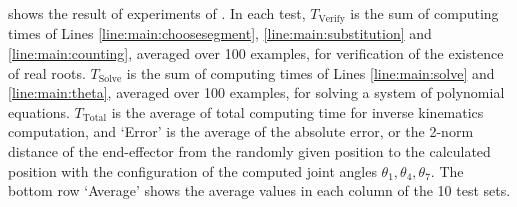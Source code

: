 \documentclass{birkjour}
\theoremstyle{plain}
\theoremstyle{definition}
\begin{document}
     shows the result of experiments of . 
    In each test, 
    $T_\textrm{Verify}$ is the sum of computing times of 
    Lines \ref{line:main:choosesegment}, \ref{line:main:substitution} and 
    \ref{line:main:counting},
    averaged over 100 examples, for verification of the existence of real roots.
    $T_\textrm{Solve}$ is the sum of computing times of 
    Lines \ref{line:main:solve} and \ref{line:main:theta},
    averaged over 100 examples, for solving a system of polynomial equations.
    $T_\textrm{Total}$ is the average of total computing time for inverse 
    kinematics computation,
    and `Error' is the average of the 
    absolute error, or the 2-norm distance of the end-effector from the randomly given position 
    to the calculated position with the configuration 
    of the computed joint angles $\theta_1,\theta_4,\theta_7$. 
    The bottom row `Average' shows the average values in each column of the 10 test sets.
\end{document}

